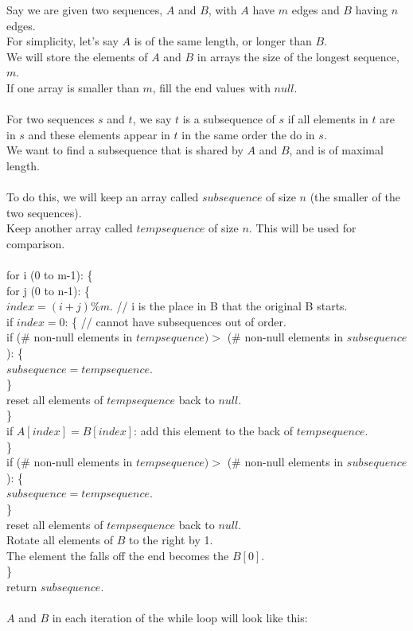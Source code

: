 \documentclass[11pt]{article}
\begin{document}
		Say we are given two sequences, $A$ and $B$, with $A$ have $m$ edges and $B$ having $n$ edges.\\
		For simplicity, let's say $A$ is of the same length, or longer than $B$. \\
		We will store the elements of $A$ and $B$ in arrays the size of the longest sequence, $m$. \\
		If one array is smaller than $m$, fill the end values with $null$.\\
		\\
		For two sequences $s$ and $t$, we say $t$ is a subsequence of $s$
		if all elements in $t$ are in $s$ and these elements appear in $t$
		in the same order the do in $s$. \\
		We want to find a subsequence that is shared by $A$ and $B$, and is of maximal length.\\
		\\
		To do this, we will keep an array called $subsequence$ of size $n$ (the smaller of the two sequences).\\
		Keep another array called $tempsequence$ of size $n$. This will be used for comparison.\\
		\\
		for i (0 to m-1): \{\\
		\indent for j (0 to n-1): \{\\
		\indent \indent $index = (i + j) \% m$. // i is the place in B that the original B starts.\\
		\indent \indent if $index = 0$: \{ // cannot have subsequences out of order.\\
		\indent \indent \indent if (\# non-null elements in $tempsequence) >$ (\# non-null elements in $subsequence$): \{\\
		\indent \indent \indent \indent $subsequence = tempsequence$.\\
		\indent \indent \indent \}	\\
		\indent \indent \indent reset all elements of $tempsequence$ back to $null$.\\
		\indent \indent \}\\
		\indent \indent if $A[index] = B[index]$: add this element to the back of $tempsequence$.\\
		\indent \}\\
		\indent if (\# non-null elements in $tempsequence) >$ (\# non-null elements in $subsequence$): \{ \\
		\indent \indent $subsequence = tempsequence$.\\
		\indent \}	\\
		\indent reset all elements of $tempsequence$ back to $null$.\\
		\indent Rotate all elements of $B$ to the right by 1.\\
		\indent The element the falls off the end becomes the $B[0]$.\\
		\}\\
		return $subsequence$.\\
		\\
		\newpage
		$A$ and $B$ in each iteration of the while loop will look like this:\\
\end{document}
